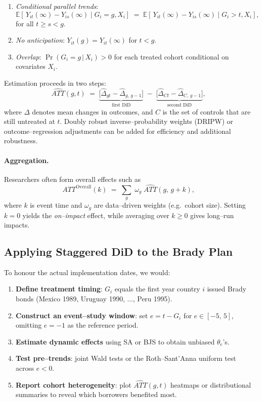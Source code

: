 \begin{enumerate}[label=(\roman*),leftmargin=1.1cm]
  \item \emph{Conditional parallel trends}:
  \[
    \mathbb{E}[\,Y_{it}(\infty)-Y_{is}(\infty)\mid G_i=g, X_i]\;=\;
    \mathbb{E}[\,Y_{it}(\infty)-Y_{is}(\infty)\mid G_i>\!t, X_i],
  \]
  for all $t\ge s<g$.
  \item \emph{No anticipation}: $Y_{it}(g)=Y_{it}(\infty)$ for $t<g$.
  \item \emph{Overlap}: $\Pr(G_i=g\,|\,X_i)>0$ for each treated cohort conditional on covariates $X_i$.
\end{enumerate}

Estimation proceeds in two steps:
\[
  \widehat{ATT}(g,t)\;=\;
  \underbrace{\bigl[\hat{\Delta}_{gt}-\hat{\Delta}_{g,\,g-1}\bigr]}_{\text{first  DiD}}
  \;-\;
  \underbrace{\bigl[\hat{\Delta}_{Ct}-\hat{\Delta}_{C,\,g-1}\bigr]}_{\text{second DiD}},
\]
where $\Delta$ denotes mean changes in outcomes, and $C$ is the set of controls that are still untreated at $t$.  
Doubly robust inverse--probability weights (DRIPW) or outcome--regression adjustments can be added for efficiency and additional robustness.

\paragraph{Aggregation.}
Researchers often form overall effects such as
\[
  ATT^{\text{Overall}}(k)\;=\;
  \sum_{g}\;\omega_g\;\widehat{ATT}(g,\,g+k),
\]
where $k$ is event time and $\omega_g$ are data--driven weights (e.g.\ cohort size).  
Setting $k=0$ yields the \emph{on--impact} effect, while averaging over $k\ge0$ gives long--run impacts.

\subsection{Applying Staggered DiD to the Brady Plan}
To honour the actual implementation dates, we would:

\begin{enumerate}[label=\arabic*.,leftmargin=1.25cm]
  \item \textbf{Define treatment timing}: $G_i$ equals the first year country $i$ issued Brady bonds (Mexico 1989, Uruguay 1990, $\dots$, Peru 1995).
  \item \textbf{Construct an event--study window}: set $e=t-G_i$ for $e\in[-5,\,5]$, omitting $e=-1$ as the reference period.
  \item \textbf{Estimate dynamic effects} using SA or BJS to obtain unbiased $\theta_{e}$'s.
  \item \textbf{Test pre--trends}: joint Wald tests or the Roth--Sant'Anna uniform test across $e<0$.
  \item \textbf{Report cohort heterogeneity}: plot $\widehat{ATT}(g,t)$ heatmaps or distributional summaries to reveal which borrowers benefited most.
\end{enumerate}

